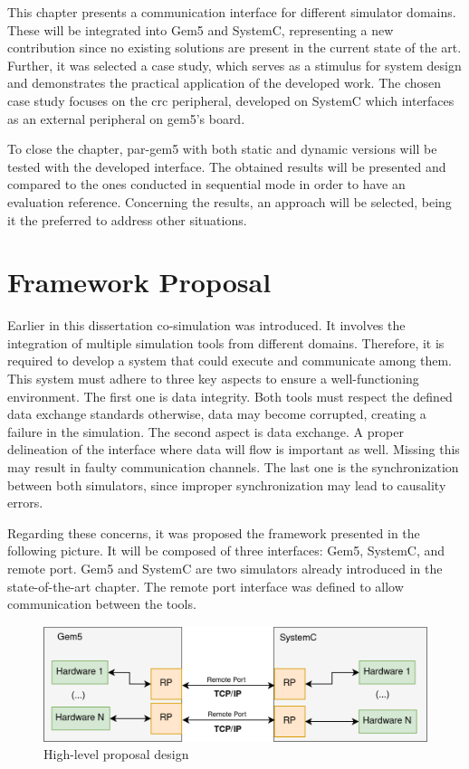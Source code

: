 
This chapter presents a communication interface for different simulator domains. These will be integrated into Gem5 and SystemC, representing 
a new contribution since no existing solutions are present in the current state of the art. Further, it was selected a 
case study, which serves as a stimulus for system design and demonstrates 
the practical application of the developed work. The chosen case study focuses on the \gls{crc} peripheral, developed on SystemC which interfaces 
as an external peripheral on gem5's board. 

To close the chapter, par-gem5 with both static and dynamic versions will be tested with the developed interface. 
The obtained results will be presented and compared to the ones conducted in sequential mode in order to have an evaluation reference. 
Concerning the results, an approach will be selected, being it the preferred to address other situations. 

\section{Framework Proposal}

Earlier in this dissertation co-simulation was introduced. It involves the integration of multiple simulation tools from different
domains. Therefore, it is required to develop a system that could execute and communicate among them. This system must adhere to three key 
aspects to ensure a well-functioning environment. The first one is data integrity. Both tools must respect the defined data exchange standards 
otherwise, data may become corrupted, creating a failure in the simulation. The second aspect is data exchange. A proper delineation of the 
interface where data will flow is important as well. Missing this may result in faulty communication channels. The last one is the synchronization 
between both simulators, since improper synchronization may lead to causality errors.

Regarding these concerns, it was proposed the framework presented in the following picture. It will be composed of three interfaces: Gem5, SystemC, 
and remote port. Gem5 and SystemC are two simulators already introduced in the state-of-the-art chapter. The remote port interface was defined to 
allow communication between the tools.

\begin{figure}[H]
	\centering
 	\includegraphics[width=0.8\linewidth]{Images/CoSimDesignSimplified.png}
 	\caption{High-level proposal design}
	 \label{fig_CoSimDesignSimplified}
\end{figure}

